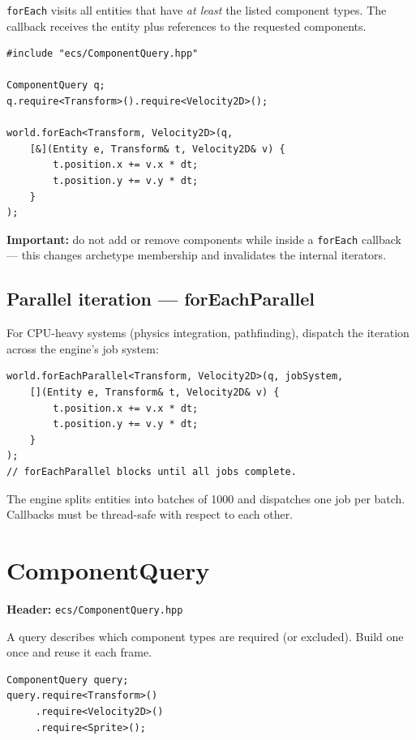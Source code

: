 \texttt{forEach} visits all entities that have \emph{at least} the listed
component types. The callback receives the entity plus references to the
requested components.

\begin{lstlisting}
#include "ecs/ComponentQuery.hpp"

ComponentQuery q;
q.require<Transform>().require<Velocity2D>();

world.forEach<Transform, Velocity2D>(q,
    [&](Entity e, Transform& t, Velocity2D& v) {
        t.position.x += v.x * dt;
        t.position.y += v.y * dt;
    }
);
\end{lstlisting}

\textbf{Important:} do not add or remove components while inside a
\texttt{forEach} callback — this changes archetype membership and invalidates
the internal iterators.

\subsection{Parallel iteration — forEachParallel}

For CPU-heavy systems (physics integration, pathfinding), dispatch the
iteration across the engine's job system:

\begin{lstlisting}
world.forEachParallel<Transform, Velocity2D>(q, jobSystem,
    [](Entity e, Transform& t, Velocity2D& v) {
        t.position.x += v.x * dt;
        t.position.y += v.y * dt;
    }
);
// forEachParallel blocks until all jobs complete.
\end{lstlisting}

The engine splits entities into batches of 1000 and dispatches one job per
batch. Callbacks must be thread-safe with respect to each other.

\section{ComponentQuery}

\textbf{Header:} \texttt{ecs/ComponentQuery.hpp}

A query describes which component types are required (or excluded). Build one
once and reuse it each frame.

\begin{lstlisting}
ComponentQuery query;
query.require<Transform>()
     .require<Velocity2D>()
     .require<Sprite>();
\end{lstlisting}

